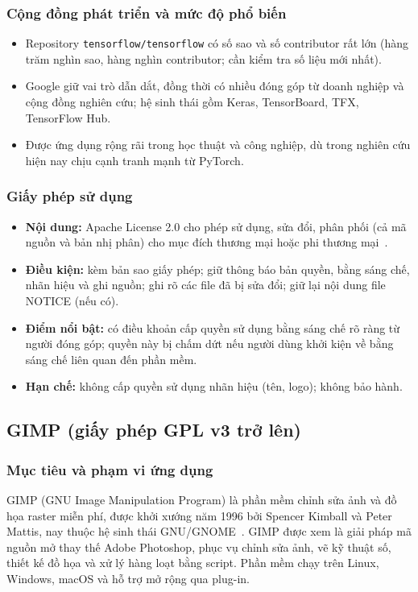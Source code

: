 \documentclass[12pt,a4paper]{article}
\newcommand{\fn}[1]{\texttt{#1}}
\begin{document}
\subsubsection*{Cộng đồng phát triển và mức độ phổ biến}
\begin{itemize}
  \item Repository \fn{tensorflow/tensorflow} có số sao và số contributor rất lớn (hàng trăm nghìn sao, hàng nghìn contributor; cần kiểm tra số liệu mới nhất).
  \item Google giữ vai trò dẫn dắt, đồng thời có nhiều đóng góp từ doanh nghiệp và cộng đồng nghiên cứu; hệ sinh thái gồm Keras, TensorBoard, TFX, TensorFlow Hub.
  \item Được ứng dụng rộng rãi trong học thuật và công nghiệp, dù trong nghiên cứu hiện nay chịu cạnh tranh mạnh từ PyTorch.
\end{itemize}
\subsubsection*{Giấy phép sử dụng}
\begin{itemize}
  \item \textbf{Nội dung:} Apache License 2.0 cho phép sử dụng, sửa đổi, phân phối (cả mã nguồn và bản nhị phân) cho mục đích thương mại hoặc phi thương mại~\cite{apache}.
  \item \textbf{Điều kiện:} kèm bản sao giấy phép; giữ thông báo bản quyền, bằng sáng chế, nhãn hiệu và ghi nguồn; ghi rõ các file đã bị sửa đổi; giữ lại nội dung file NOTICE (nếu có).
  \item \textbf{Điểm nổi bật:} có điều khoản cấp quyền sử dụng bằng sáng chế rõ ràng từ người đóng góp; quyền này bị chấm dứt nếu người dùng khởi kiện về bằng sáng chế liên quan đến phần mềm.
  \item \textbf{Hạn chế:} không cấp quyền sử dụng nhãn hiệu (tên, logo); không bảo hành.
\end{itemize}

\subsection{GIMP (giấy phép GPL v3 trở lên)}\label{sec:gimp}
\subsubsection*{Mục tiêu và phạm vi ứng dụng}
GIMP (GNU Image Manipulation Program) là phần mềm chỉnh sửa ảnh và đồ họa raster miễn phí, được khởi xướng năm 1996 bởi Spencer Kimball và Peter Mattis, nay thuộc hệ sinh thái GNU/GNOME~\cite{gimp}. GIMP được xem là giải pháp mã nguồn mở thay thế Adobe Photoshop, phục vụ chỉnh sửa ảnh, vẽ kỹ thuật số, thiết kế đồ họa và xử lý hàng loạt bằng script. Phần mềm chạy trên Linux, Windows, macOS và hỗ trợ mở rộng qua plug-in.
\end{document}

